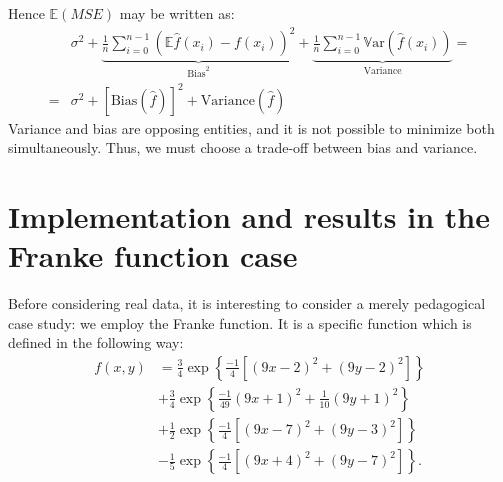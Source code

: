\documentclass{emulateapj}
\begin{document}
Hence $\mathbb{E}(MSE)$ may be written as:
\begin{equation}
\begin{split}
 &\sigma^2 + \underbrace{\frac{1}{n}\sum_{i=0}^{n-1}(\mathbb{E}\hat{f}(x_i) - f(x_i) )^2}_{\mathrm{Bias}^2} + \underbrace{\frac{1}{n}\sum_{i=0}^{n-1} \mathbb{V}\mathrm{ar}(\hat{f}(x_i))}_{\mathrm{Variance}} =
\\
=&\sigma^2 + [\mathrm{Bias}(\hat{f})]^2+\mathrm{Variance}(\hat{f})
\end{split}
\end{equation}
Variance and bias are opposing entities, and it is not possible to minimize both simultaneously. Thus, we must choose a trade-off between bias and variance.


\section{Implementation and results in the Franke function case}
Before considering real data, it is interesting to consider a merely pedagogical case study: we employ the Franke function. 
It is a specific function which is defined in the following way:
\begin{align}
f(x,y) &= \frac{3}{4}\exp\left\{\frac{-1}{4}\left[\left(9x-2\right)^2 + \left(9y-2\right)^2\right]\right\}\nonumber \\
&+ \frac{3}{4}\exp\left\{\frac{-1}{49}\left(9x+1\right)^2 + \frac{1}{10}\left(9y+1\right)^2\right\}\nonumber \\
&+ \frac{1}{2}\exp\left\{\frac{-1}{4}\left[\left(9x-7\right)^2 + \left(9y-3\right)^2\right]\right\}\nonumber \\
&- \frac{1}{5}\exp\left\{\frac{-1}{4}\left[\left(9x+4\right)^2 + \left(9y-7\right)^2\right]\right\}.
\end{align}
\end{document}
